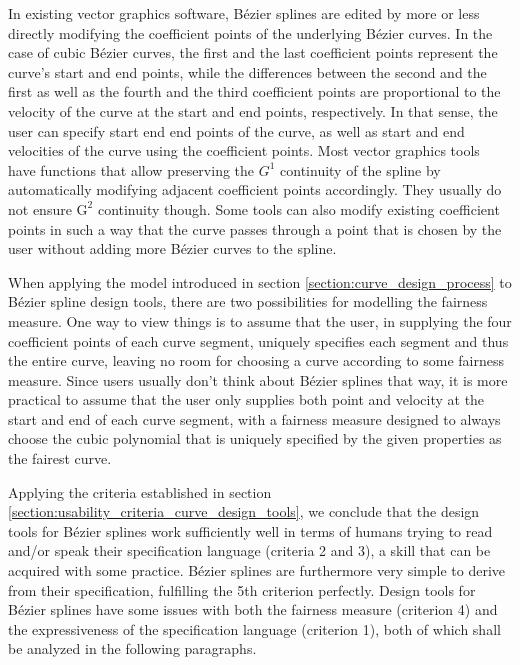\documentclass[a4paper]{article}
\begin{document}
				In existing vector graphics software, Bézier splines are edited by more or less directly modifying the coefficient points of the underlying Bézier curves. In the case of cubic Bézier curves, the first and the last coefficient points represent the curve's start and end points, while the differences between the second and the first as well as the fourth and the third coefficient points are proportional to the velocity of the curve at the start and end points, respectively. In that sense, the user can specify start end end points of the curve, as well as start and end velocities of the curve using the coefficient points. Most vector graphics tools have functions that allow preserving the \(G^1\) continuity of the spline by automatically modifying adjacent coefficient points accordingly. They usually do not ensure \(\mathrm{G}^2\) continuity though. Some tools can also modify existing coefficient points in such a way that the curve passes through a point that is chosen by the user without adding more Bézier curves to the spline.

				When applying the model introduced in section \ref{section:curve_design_process} to Bézier spline design tools, there are two possibilities for modelling the fairness measure. One way to view things is to assume that the user, in supplying the four coefficient points of each curve segment, uniquely specifies each segment and thus the entire curve, leaving no room for choosing a curve according to some fairness measure. Since users usually don't think about Bézier splines that way, it is more practical to assume that the user only supplies both point and velocity at the start and end of each curve segment, with a fairness measure designed to always choose the cubic polynomial that is uniquely specified by the given properties as the fairest curve.

				Applying the criteria established in section \ref{section:usability_criteria_curve_design_tools}, we conclude that the design tools for Bézier splines work sufficiently well in terms of humans trying to read and/or speak their specification language (criteria 2 and 3), a skill that can be acquired with some practice. Bézier splines are furthermore very simple to derive from their specification, fulfilling the 5th criterion perfectly. Design tools for Bézier splines have some issues with both the fairness measure (criterion 4) and the expressiveness of the specification language (criterion 1), both of which shall be analyzed in the following paragraphs.
\end{document}
